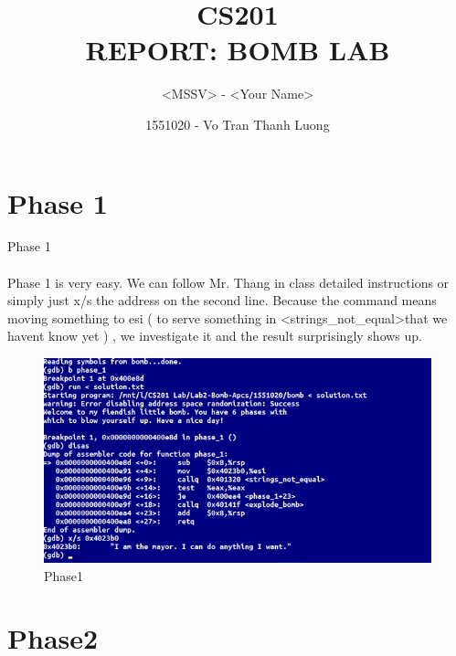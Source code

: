 \documentclass[a4paper]{article}
\begin{document}
\title{CS201\\REPORT: BOMB LAB}

\author{<MSSV> - <Your Name>}
\author{1551020 - Vo Tran Thanh Luong}
\maketitle


\setcounter{page}{1}
\tableofcontents
{}

\clearpage



\section{Phase 1}
Phase 1

\paragraph{}  
 Phase 1 is very easy. We can follow Mr. Thang in class detailed instructions or simply just x/s the address on the second line. Because the command means moving something to esi ( to serve something in  \textless strings\_not\_equal\textgreater  that we havent know yet ) , we investigate it and the result surprisingly shows up.  

\begin{figure}[h!]
  \includegraphics[width=\linewidth]{bai1.png}
  \caption{Phase1}
  \label{}
\end{figure}


\section{Phase2}
\end{document}
